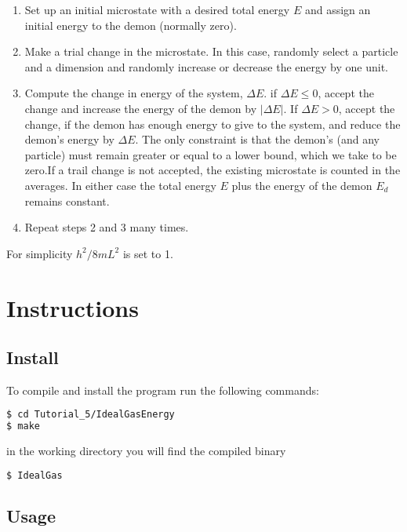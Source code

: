 \documentclass[10pt]{article}
\begin{document}
 \begin{enumerate}

\item Set up an initial microstate with a desired total energy $E$ and assign an initial energy to the demon (normally zero).
\item Make a trial change in the microstate. In this case, randomly select a particle and a dimension and randomly increase or decrease the energy by one unit.
\item Compute the change in energy of the system, $\Delta E$. if $\Delta E \leq 0$, accept the change and increase the energy of the demon by $|\Delta E|$. If $\Delta E > 0$, accept the change, if the demon has enough energy to give to the system, and reduce the demon's energy by $\Delta E$. The only constraint is that the demon's (and any particle) must remain greater or equal to a lower bound, which we take to be zero.If a trail change is not accepted, the existing microstate is counted in the averages. In either case the total energy $E$ plus the energy of the demon $E_d$ remains constant.
\item Repeat steps 2 and 3 many times. 

\end{enumerate}

For simplicity $h^2/8mL^2$ is set to 1.



\section{Instructions}

\subsection{Install}

To compile and install the program run the following commands:

\begin{lstlisting}[language=bash]
$ cd Tutorial_5/IdealGasEnergy
$ make
\end{lstlisting} 
%
in the working directory you will find the compiled binary 

\begin{lstlisting}[language=bash]
$ IdealGas
\end{lstlisting} 


\subsection{Usage}
\end{document}
